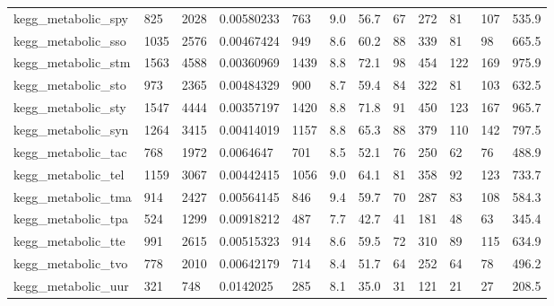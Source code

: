 \begin{longtable}{llllllllllll}
 kegg\_metabolic\_spy                                 & 825        & 2028      & 0.00580233  & 763   & 9.0    & 56.7   & 67    & 272    & 81     & 107    & 535.9   \\
 kegg\_metabolic\_sso                                 & 1035       & 2576      & 0.00467424  & 949   & 8.6    & 60.2   & 88    & 339    & 81     & 98     & 665.5   \\
 kegg\_metabolic\_stm                                 & 1563       & 4588      & 0.00360969  & 1439  & 8.8    & 72.1   & 98    & 454    & 122    & 169    & 975.9   \\
 kegg\_metabolic\_sto                                 & 973        & 2365      & 0.00484329  & 900   & 8.7    & 59.4   & 84    & 322    & 81     & 103    & 632.5   \\
 kegg\_metabolic\_sty                                 & 1547       & 4444      & 0.00357197  & 1420  & 8.8    & 71.8   & 91    & 450    & 123    & 167    & 965.7   \\
 kegg\_metabolic\_syn                                 & 1264       & 3415      & 0.00414019  & 1157  & 8.8    & 65.3   & 88    & 379    & 110    & 142    & 797.5   \\
 kegg\_metabolic\_tac                                 & 768        & 1972      & 0.0064647   & 701   & 8.5    & 52.1   & 76    & 250    & 62     & 76     & 488.9   \\
 kegg\_metabolic\_tel                                 & 1159       & 3067      & 0.00442415  & 1056  & 9.0    & 64.1   & 81    & 358    & 92     & 123    & 733.7   \\
 kegg\_metabolic\_tma                                 & 914        & 2427      & 0.00564145  & 846   & 9.4    & 59.7   & 70    & 287    & 83     & 108    & 584.3   \\
 kegg\_metabolic\_tpa                                 & 524        & 1299      & 0.00918212  & 487   & 7.7    & 42.7   & 41    & 181    & 48     & 63     & 345.4   \\
 kegg\_metabolic\_tte                                 & 991        & 2615      & 0.00515323  & 914   & 8.6    & 59.5   & 72    & 310    & 89     & 115    & 634.9   \\
 kegg\_metabolic\_tvo                                 & 778        & 2010      & 0.00642179  & 714   & 8.4    & 51.7   & 64    & 252    & 64     & 78     & 496.2   \\
 kegg\_metabolic\_uur                                 & 321        & 748       & 0.0142025   & 285   & 8.1    & 35.0   & 31    & 121    & 21     & 27     & 208.5   \\

\end{longtable}
